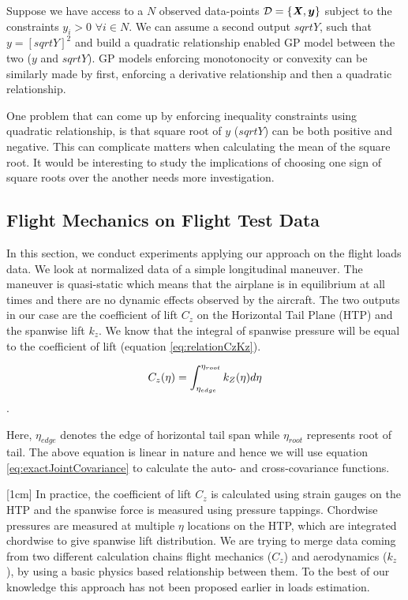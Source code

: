 Suppose we have access to a $N$ observed data-points $\mathcal{D} = \{\bm{\mathit{X}}, \boldsymbol{y}\}$ subject to the constraints $y_i > 0$ $\forall i \in N$. We can assume a second output $sqrtY$, such that $y = \left [sqrtY \right]^2$ and build a quadratic relationship enabled GP model between the two ($y$ and $sqrtY$). GP models enforcing monotonocity or convexity can be similarly made by first, enforcing a derivative relationship and then a quadratic relationship. 

One problem that can come up by enforcing inequality constraints using quadratic relationship, is that square root of $y$ ($sqrtY$) can be both positive and negative. This can complicate matters when calculating the mean of the square root. It would be interesting to study the implications of choosing one sign of square roots over the another needs more investigation. 

\subsection{Flight Mechanics on Flight Test Data}\label{sub:experimentsFlightLoadsData}
In this section, we conduct experiments applying our approach on the flight loads data. We look at normalized data of a simple longitudinal maneuver. The maneuver is quasi-static which means that the airplane is in equilibrium at all times and there are no dynamic effects observed by the aircraft. The two outputs in our case are the coefficient of lift \(C_{z}\) on the Horizontal Tail Plane (HTP) and the spanwise lift \(k_{z}\). We know that the integral of spanwise pressure will be equal to the coefficient of lift (equation \ref{eq:relationCzKz}).

\begin{equation}\label{eq:relationCzKz}
\centering
C_{z}(\eta) = \int_{\eta_{edge}}^{\eta_{root}} k_{Z}(\eta)d\eta
\end{equation}.

Here, \(\eta_{edge}\) denotes the edge of horizontal tail span while \(\eta_{root}\) represents root of tail. The above equation is linear in nature and hence we will use equation \ref{eq:exactJointCovariance} to calculate the auto- and cross-covariance functions.

[1cm]
In practice, the coefficient of lift \(C_{z}\) is calculated using strain gauges on the HTP and the spanwise force is measured using pressure tappings. Chordwise pressures are measured at multiple \(\eta\) locations on the HTP, which are integrated chordwise to give spanwise lift distribution. We are trying to merge data coming from two different calculation chains flight mechanics (\(C_{z}\)) and aerodynamics (\(k_{z}\)), by using a basic physics based relationship between them. To the best of our knowledge this approach has not been proposed earlier in loads estimation.

